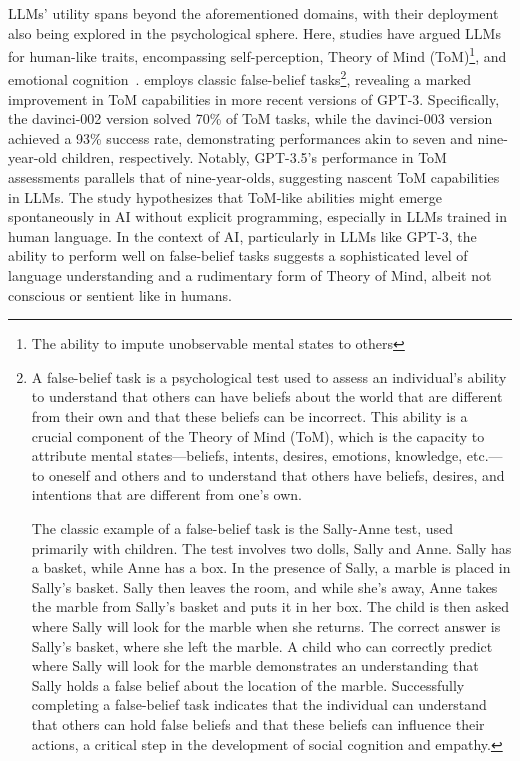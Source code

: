 LLMs' utility spans beyond the aforementioned domains, with their deployment also being explored in the psychological sphere.
Here, studies have argued LLMs for human-like traits, encompassing self-perception, Theory of Mind (ToM)\footnote{The ability to impute unobservable mental states to others}, and emotional cognition~\cite{kosinski2023theoryofmind, amin2023affectivecomputing}.
\textcite{kosinski2023theoryofmind} employs classic false-belief tasks\footnote{A false-belief task is a psychological test used to assess an individual's ability to understand that others can have beliefs about the world that are different from their own and that these beliefs can be incorrect. This ability is a crucial component of the Theory of Mind (ToM), which is the capacity to attribute mental states—beliefs, intents, desires, emotions, knowledge, etc.—to oneself and others and to understand that others have beliefs, desires, and intentions that are different from one's own.

	The classic example of a false-belief task is the Sally-Anne test, used primarily with children. The test involves two dolls, Sally and Anne. Sally has a basket, while Anne has a box. In the presence of Sally, a marble is placed in Sally's basket. Sally then leaves the room, and while she's away, Anne takes the marble from Sally's basket and puts it in her box. The child is then asked where Sally will look for the marble when she returns. The correct answer is Sally's basket, where she left the marble. A child who can correctly predict where Sally will look for the marble demonstrates an understanding that Sally holds a false belief about the location of the marble.
	Successfully completing a false-belief task indicates that the individual can understand that others can hold false beliefs and that these beliefs can influence their actions, a critical step in the development of social cognition and empathy.}, revealing a marked improvement in ToM capabilities in more recent versions of GPT-3.
Specifically, the davinci-002 version solved 70\% of ToM tasks, while the davinci-003 version achieved a 93\% success rate, demonstrating performances akin to seven and nine-year-old children, respectively.
Notably, GPT-3.5's performance in ToM assessments parallels that of nine-year-olds, suggesting nascent ToM capabilities in LLMs.
The study hypothesizes that ToM-like abilities might emerge spontaneously in AI without explicit programming, especially in LLMs trained in human language.
In the context of AI, particularly in LLMs like GPT-3, the ability to perform well on false-belief tasks suggests a sophisticated level of language understanding and a rudimentary form of Theory of Mind, albeit not conscious or sentient like in humans.

